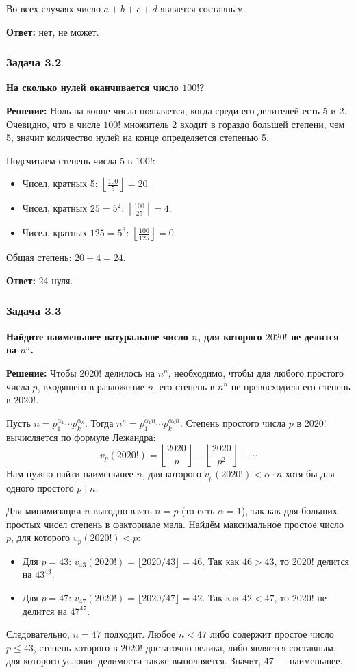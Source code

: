 \documentclass[12pt, a4paper]{article}
\begin{document}
Во всех случаях число $a + b + c + d$ является составным.

\textbf{Ответ:} нет, не может.

\subsubsection*{Задача 3.2}
\textbf{На сколько нулей оканчивается число $100!$?}

\textbf{Решение:}
Ноль на конце числа появляется, когда среди его делителей есть 5 и 2. Очевидно, что в числе $100!$ множитель 2 входит в гораздо большей степени, чем 5, значит количество нулей на конце определяется степенью 5.

Подсчитаем степень числа 5 в $100!$:
\begin{itemize}
    \item Чисел, кратных 5: $\left\lfloor \frac{100}{5} \right\rfloor = 20$.
    \item Чисел, кратных $25 = 5^2$: $\left\lfloor \frac{100}{25} \right\rfloor = 4$.
    \item Чисел, кратных $125 = 5^3$: $\left\lfloor \frac{100}{125} \right\rfloor = 0$.
\end{itemize}
Общая степень: $20 + 4 = 24$.

\textbf{Ответ:} 24 нуля.

\subsubsection*{Задача 3.3}
\textbf{Найдите наименьшее натуральное число $n$, для которого $2020!$ не делится на $n^n$.}

\textbf{Решение:}
Чтобы $2020!$ делилось на $n^n$, необходимо, чтобы для любого простого числа $p$, входящего в разложение $n$, его степень в $n^n$ не превосходила его степень в $2020!$.

Пусть $n = p_1^{\alpha_1} \cdots p_k^{\alpha_k}$. Тогда $n^n = p_1^{\alpha_1 n} \cdots p_k^{\alpha_k n}$. Степень простого числа $p$ в $2020!$ вычисляется по формуле Лежандра:
\[
v_p(2020!) = \left\lfloor \frac{2020}{p} \right\rfloor + \left\lfloor \frac{2020}{p^2} \right\rfloor + \cdots
\]
Нам нужно найти наименьшее $n$, для которого $v_p(2020!) < \alpha \cdot n$ хотя бы для одного простого $p \mid n$.

Для минимизации $n$ выгодно взять $n = p$ (то есть $\alpha = 1$), так как для больших простых чисел степень в факториале мала. Найдём максимальное простое число $p$, для которого $v_p(2020!) < p$:
\begin{itemize}
    \item Для $p = 43$: $v_{43}(2020!) = \lfloor 2020/43 \rfloor = 46$. Так как $46 > 43$, то $2020!$ делится на $43^{43}$.
    \item Для $p = 47$: $v_{47}(2020!) = \lfloor 2020/47 \rfloor = 42$. Так как $42 < 47$, то $2020!$ не делится на $47^{47}$.
\end{itemize}
Следовательно, $n = 47$ подходит. Любое $n < 47$ либо содержит простое число $p \le 43$, степень которого в $2020!$ достаточно велика, либо является составным, для которого условие делимости также выполняется. Значит, 47 — наименьшее.
\end{document}
